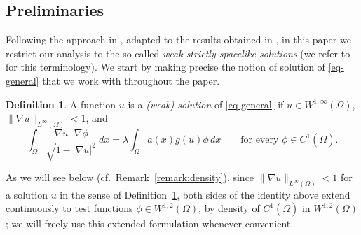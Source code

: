 \documentclass[11pt,reqno]{amsart}
\theoremstyle{plain}
\theoremstyle{definition}
\newtheorem{definition}[theorem]{Definition}
\newtheorem{remark}[theorem]{Remark}
\numberwithin{equation}{section}
\begin{document}




\subsection{Preliminaries}

Following the approach in \cite{BeJeMa14}, adapted to the results obtained in \cite{Ma26}, in this paper we restrict our analysis to the so-called \emph{weak strictly spacelike solutions} (we refer to \cite{BaSi82} for this terminology). We start by making precise the notion of solution of \eqref{eq-general} that we work with throughout the paper.

\begin{definition}\label{def:solution}
A function $u$ is a \emph{(weak) solution} of \eqref{eq-general} if $u \in W^{1,\infty}(\Omega)$,  $\|\nabla u\|_{L^\infty(\Omega)} < 1$, and
$$
\int_\Omega \frac{\nabla u \cdot \nabla \phi}{\sqrt{1-|\nabla u|^2}} \, dx = \lambda \int_\Omega a(x) g(u) \phi \, dx \qquad \text{for every } \phi \in C^1(\overline\Omega).
$$
\end{definition}

As we will see below (cf.\ Remark~\ref{remark:density}), since $\|\nabla u\|_{L^\infty(\Omega)}<1$ for a solution $u$ in the sense of Definition~\ref{def:solution}, both sides of the identity above extend continuously to test functions $\phi \in W^{1,2}(\Omega)$, by density of $C^1(\overline\Omega)$ in $W^{1,2}(\Omega)$; we will freely use this extended formulation whenever convenient.
\end{document}
